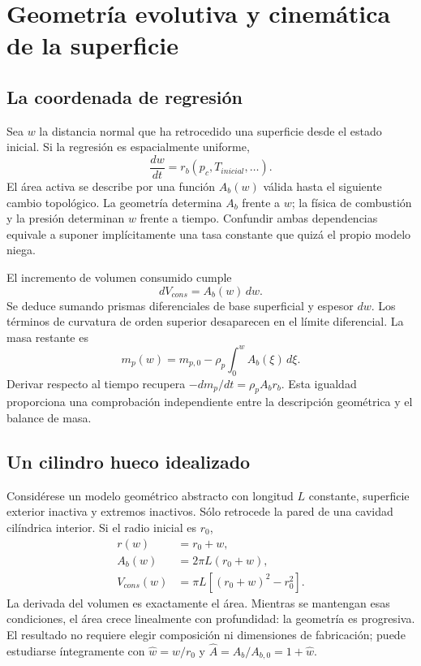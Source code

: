 \chapter{Geometría evolutiva y cinemática de la superficie}\label{ch:11}
\section{La coordenada de regresión}
Sea $w$ la distancia normal que ha retrocedido una superficie desde el estado inicial. Si la regresión es espacialmente uniforme,
\[
 \frac{dw}{dt}=r_b(p_c,T_{inicial},\ldots).
\]
El área activa se describe por una función $A_b(w)$ válida hasta el siguiente cambio topológico. La geometría determina $A_b$ frente a $w$; la física de combustión y la presión determinan $w$ frente a tiempo. Confundir ambas dependencias equivale a suponer implícitamente una tasa constante que quizá el propio modelo niega.

El incremento de volumen consumido cumple
\begin{equation}\label{eq:volumeweb}
 dV_{cons}=A_b(w)\,dw.
\end{equation}
Se deduce sumando prismas diferenciales de base superficial y espesor $dw$. Los términos de curvatura de orden superior desaparecen en el límite diferencial. La masa restante es
\[
 m_p(w)=m_{p,0}-\rho_p\int_0^wA_b(\xi)\,d\xi.
\]
Derivar respecto al tiempo recupera $-dm_p/dt=\rho_pA_br_b$. Esta igualdad proporciona una comprobación independiente entre la descripción geométrica y el balance de masa.
\section{Un cilindro hueco idealizado}
Considérese un modelo geométrico abstracto con longitud $L$ constante, superficie exterior inactiva y extremos inactivos. Sólo retrocede la pared de una cavidad cilíndrica interior. Si el radio inicial es $r_0$,
\begin{align}
 r(w)&=r_0+w,\\
 A_b(w)&=2\pi L(r_0+w),\\
 V_{cons}(w)&=\pi L[(r_0+w)^2-r_0^2].
\end{align}
La derivada del volumen es exactamente el área. Mientras se mantengan esas condiciones, el área crece linealmente con profundidad: la geometría es progresiva. El resultado no requiere elegir composición ni dimensiones de fabricación; puede estudiarse íntegramente con $\widehat w=w/r_0$ y $\widehat A=A_b/A_{b,0}=1+\widehat w$.

